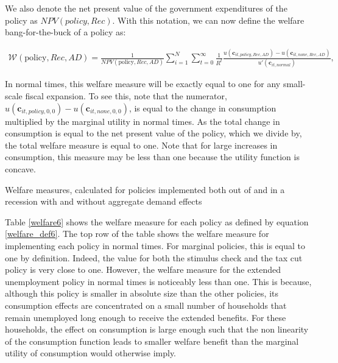 \documentclass[\econtexRoot/HAFiscal]{subfiles}
\begin{document}
We also denote the net present value of the government expenditures of the policy as $NPV(\textit{policy},Rec)$. With this notation, we can now define the welfare bang-for-the-buck of a policy as:

\begin{align} \label{welfare_def6}
	\mathcal{W}(\text{policy},Rec,AD) =\frac{1}{NPV(\text{policy},Rec,AD)}\sum_{i=1}^{N} \sum_{t=0}^{\infty} \frac{1}{R^t} \frac{u(\mathbf{c}_{it,\textit{policy},Rec,AD}) - u(\mathbf{c}_{it,\textit{none},Rec,AD})}{ u'(\mathbf{c}_{it,\textit{normal}})} ,
\end{align}

In normal times, this welfare measure will be exactly equal to one for any small-scale fiscal expansion. To see this, note that the numerator,  $u(\mathbf{c}_{it,\textit{policy},0,0}) - u(\mathbf{c}_{it,\textit{none},0,0})$, is equal to the change in consumption multiplied by the marginal utility in normal times. As the total change in consumption is equal to the net present value of the policy, which we divide by, the total welfare measure is equal to one. Note that for large increases in consumption, this measure may be less than one because the utility function is concave.

\begin{table}[ht] 
	\center
	
	\caption{Welfare measures, calculated for policies implemented both out of and in a recession with and without aggregate demand effects}
	\notinsubfile{\label{welfare6}}
\end{table}

Table \ref{welfare6} shows the welfare measure for each policy as defined by equation \eqref{welfare_def6}. The top row of the table shows the welfare measure for implementing each policy in normal times. For marginal policies, this is equal to one by definition. Indeed, the value for both the stimulus check and the tax cut policy is very close to one. However, the welfare measure for the extended unemployment policy in normal times is noticeably less than one. This is because, although this policy is smaller in absolute size than the other policies, its consumption effects are concentrated on a small number of households that remain unemployed long enough to receive the extended benefits. For these households, the effect on consumption is large enough such that the non linearity of the consumption function leads to smaller welfare benefit than the marginal utility of consumption would otherwise imply.
\end{document}

